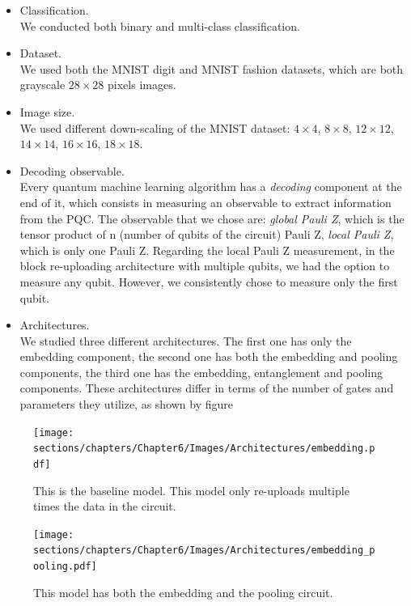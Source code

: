 \begin{itemize}
    \item Classification.\\
    We conducted both binary and multi-class classification.
    \item Dataset.\\
    We used both the MNIST digit and MNIST fashion datasets, which are both grayscale $28\times28$ pixels images.
    \item Image size.\\
    We used different down-scaling of the MNIST dataset:
    $4\times4$, $8\times8$, $12\times12$, $14\times14$, $16\times16$, $18\times18$.
    \item Decoding observable.\\
    Every quantum machine learning algorithm has a \textit{decoding} component at the end of it, which consists in 
    measuring an observable to extract information from the PQC.
    The observable that we chose are: \textit{global Pauli Z}, which is the tensor product of n (number of qubits
    of the circuit) Pauli Z, \textit{local Pauli Z}, which is only one Pauli Z.
    Regarding the local Pauli Z measurement, in the block re-uploading architecture with multiple qubits, 
    we had the option to measure any qubit. However, we consistently chose to measure only the first qubit.
    \item Architectures.\\
    We studied three different architectures.
    The first one has only the embedding component, the second one has both the embedding and pooling components, the third
    one has the embedding, entanglement and pooling components.
    These architectures differ in terms of the number of gates and parameters they utilize, as shown by
    figure  
\end{itemize}

\begin{figure}[h]
    \centering
    \texttt{[image: sections/chapters/Chapter6/Images/Architectures/embedding.pdf]}
    \caption{This is the baseline model. This model only re-uploads multiple times the data in the circuit.}
    \label{arc:embed}
\end{figure}

\begin{figure}[h]
    \centering
    \texttt{[image: sections/chapters/Chapter6/Images/Architectures/embedding\_pooling.pdf]}
    \caption{This model has both the embedding and the pooling circuit.}
    \label{arc:embed-pooling}
\end{figure}

